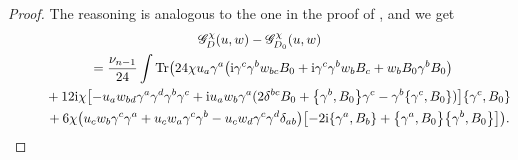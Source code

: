 \documentclass[10pt,a4paper]{amsart}
\numberwithin{equation}{section}
\theoremstyle{definition}
\begin{document}
\begin{proof}
 The reasoning is analogous to the one in the proof of \cite[Proposition~II.1.]{bochniak2025}, and we get
\begin{gather*}%
				\mathscr{G}_D^\chi(u,w)-\mathscr{G}_{D_0}^\chi(u,w) \\
			\qquad=\frac{\nu_{n-1}}{24}\int\operatorname{Tr}\bigl(24\chi u_a\gamma^a\bigl( {\rm i}\gamma^c\gamma^bw_{bc}B_0 + {\rm i} \gamma^c\gamma^bw_bB_c+w_bB_0\gamma^bB_0\bigr)\nonumber\\
			 \phantom{\qquad=}{} +12 {\rm i} \chi\bigl[-u_aw_{bd}\gamma^a\gamma^d\gamma^b\gamma^c
			 + {\rm i}u_aw_b\gamma^a(2\delta^{bc}B_0
			 + \bigl\{\gamma^b,B_0\bigr\}\gamma^c - \gamma^b\{\gamma^c,B_0\})\bigr]\{\gamma^c,B_0\}\\
			 \phantom{\qquad=}{} +6\chi\bigl(u_cw_b\gamma^c\gamma^a + u_cw_a\gamma^c\gamma^b
			 - u_cw_d\gamma^c\gamma^d\delta_{ab}\bigr)\bigl[-2 {\rm i}\{\gamma^a,B_b\} + \bigl\{\gamma^a,B_0\bigr\}\bigl\{\gamma^b,B_0\bigr\}\bigr]\bigr).
		\end{gather*}
	

\end{proof}
\end{document}
